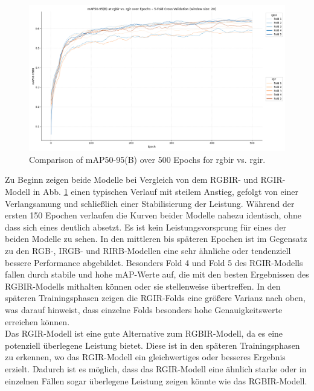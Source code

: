 \begin{figure}[h] 
    \centering %
    \includegraphics[width=1\textwidth]{images/rgbir/mAP@50-95/rgbir_vs_rgir_full.png} %
    \caption{Comparison of mAP50-95(B) over 500 Epochs for rgbir vs. rgir.} %
    \label{fig:map_rgbir_rgir} %
\end{figure}
Zu Beginn zeigen beide Modelle bei Vergleich von dem RGBIR- und RGIR-Modell in Abb. \ref{fig:map_rgbir_rgir} einen typischen Verlauf mit steilem Anstieg, gefolgt von einer Verlangsamung und schließlich einer Stabilisierung der Leistung. Während der ersten 150 Epochen verlaufen die Kurven beider Modelle nahezu identisch, ohne dass sich eines deutlich absetzt. Es ist kein Leistungsvorsprung für eines der beiden Modelle zu sehen. In den mittleren bis späteren Epochen ist im Gegensatz zu den RGB-, IRGB- und RIRB-Modellen eine sehr ähnliche oder tendenziell bessere Performance abgebildet. Besonders Fold 4 und Fold 5 des RGIR-Modells fallen durch stabile und hohe mAP-Werte auf, die mit den besten Ergebnissen des RGBIR-Modells mithalten können oder sie stellenweise übertreffen. In den späteren Trainingsphasen zeigen die RGIR-Folds eine größere Varianz nach oben, was darauf hinweist, dass einzelne Folds besonders hohe Genauigkeitswerte erreichen können. \\
Das RGIR-Modell ist eine gute Alternative zum RGBIR-Modell, da es eine potenziell überlegene Leistung bietet. Diese ist in den späteren Trainingsphasen zu erkennen, wo das RGIR-Modell ein gleichwertiges oder besseres Ergebnis erzielt. Dadurch ist es möglich, dass das RGIR-Modell eine ähnlich starke oder in einzelnen Fällen sogar überlegene Leistung zeigen könnte wie das RGBIR-Modell.



